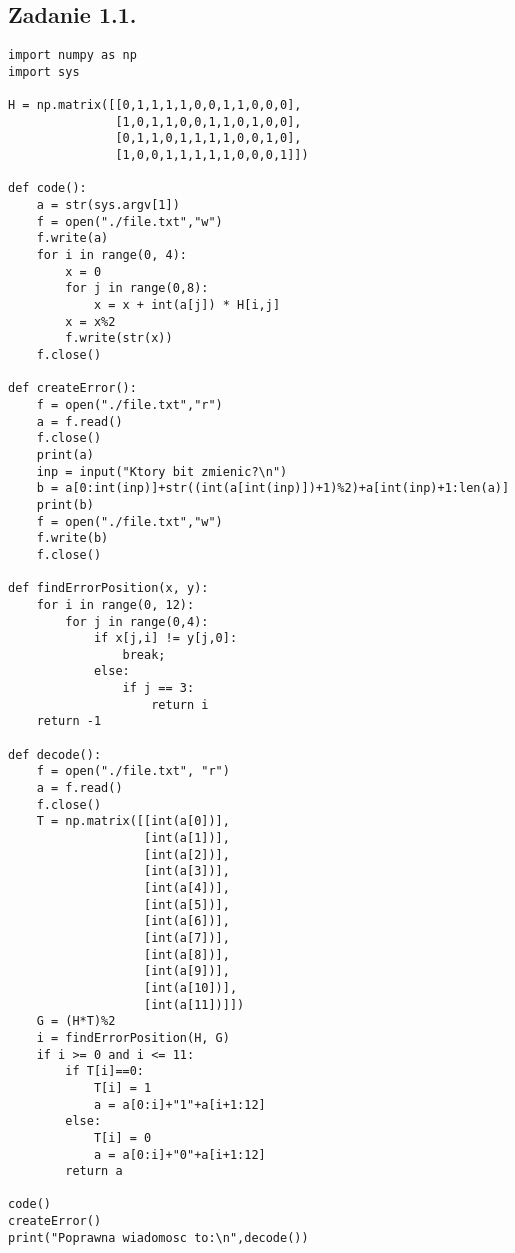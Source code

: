 \documentclass[a4paper, portrait,11pt]{article}
\begin{document}
\subsection*{Zadanie 1.1.}
\begin{lstlisting}
import numpy as np
import sys

H = np.matrix([[0,1,1,1,1,0,0,1,1,0,0,0],
               [1,0,1,1,0,0,1,1,0,1,0,0],
               [0,1,1,0,1,1,1,1,0,0,1,0],
               [1,0,0,1,1,1,1,1,0,0,0,1]])

def code():
    a = str(sys.argv[1])
    f = open("./file.txt","w")
    f.write(a)
    for i in range(0, 4):
	    x = 0
	    for j in range(0,8):
		    x = x + int(a[j]) * H[i,j]
	    x = x%2
	    f.write(str(x))
    f.close()

def createError():
    f = open("./file.txt","r")
    a = f.read()
    f.close()
    print(a)
    inp = input("Ktory bit zmienic?\n")
    b = a[0:int(inp)]+str((int(a[int(inp)])+1)%2)+a[int(inp)+1:len(a)]
    print(b)
    f = open("./file.txt","w")
    f.write(b)
    f.close()

def findErrorPosition(x, y):
    for i in range(0, 12):
        for j in range(0,4):
            if x[j,i] != y[j,0]:
                break;
            else:
                if j == 3:
                    return i
    return -1

def decode():
    f = open("./file.txt", "r")
    a = f.read()
    f.close()
    T = np.matrix([[int(a[0])],
                   [int(a[1])],
                   [int(a[2])],
                   [int(a[3])],
                   [int(a[4])],
                   [int(a[5])],
                   [int(a[6])],
                   [int(a[7])],
                   [int(a[8])],
                   [int(a[9])],
                   [int(a[10])],
                   [int(a[11])]])
    G = (H*T)%2
    i = findErrorPosition(H, G)
    if i >= 0 and i <= 11:
        if T[i]==0:
            T[i] = 1
            a = a[0:i]+"1"+a[i+1:12]
        else:
            T[i] = 0
            a = a[0:i]+"0"+a[i+1:12]
        return a

code()
createError()
print("Poprawna wiadomosc to:\n",decode())
\end{lstlisting}
\newpage
\end{document}
